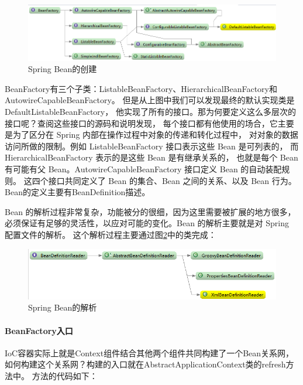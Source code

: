 \documentclass{book}
\begin{document}
\begin{figure}[htbp]
	\centering
	\includegraphics[scale=0.5]{SpringBeanCreateRelation.png}
	\caption{Spring Bean的创建}
	\label{fig:SpringBeanCreateRelation}
\end{figure}

BeanFactory有三个子类：ListableBeanFactory、HierarchicalBeanFactory和AutowireCapableBeanFactory。
但是从上图中我们可以发现最终的默认实现类是DefaultListableBeanFactory，
他实现了所有的接口。那为何要定义这么多层次的接口呢？查阅这些接口的源码和说明发现，
每个接口都有他使用的场合，它主要是为了区分在 Spring 内部在操作过程中对象的传递和转化过程中，
对对象的数据访问所做的限制。例如 ListableBeanFactory 接口表示这些 Bean 是可列表的，
而 HierarchicalBeanFactory 表示的是这些 Bean 是有继承关系的，
也就是每个 Bean 有可能有父 Bean。AutowireCapableBeanFactory 接口定义 Bean 的自动装配规则。
这四个接口共同定义了 Bean 的集合、Bean 之间的关系、以及 Bean 行为。
Bean的定义主要有BeanDefinition描述。

Bean 的解析过程非常复杂，功能被分的很细，因为这里需要被扩展的地方很多，
必须保证有足够的灵活性，以应对可能的变化。Bean 的解析主要就是对 Spring 配置文件的解析。
这个解析过程主要通过图\ref{fig:SpringBeanParse}中的类完成：

\begin{figure}[htbp]
	\centering
	\includegraphics[scale=0.5]{SpringBeanParse.png}
	\caption{Spring Bean的解析}
	\label{fig:SpringBeanParse}
\end{figure}

\paragraph{BeanFactory入口}

IoC容器实际上就是Context组件结合其他两个组件共同构建了一个Bean关系网，
如何构建这个关系网？构建的入口就在AbstractApplicationContext类的refresh方法中。
方法的代码如下：
\end{document}
